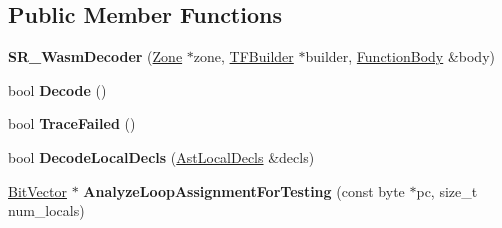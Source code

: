 \subsection*{Public Member Functions}
\begin{DoxyCompactItemize}
\item 
{\bfseries S\+R\+\_\+\+Wasm\+Decoder} (\hyperlink{classv8_1_1internal_1_1_zone}{Zone} $\ast$zone, \hyperlink{classv8_1_1internal_1_1compiler_1_1_wasm_graph_builder}{T\+F\+Builder} $\ast$builder, \hyperlink{structv8_1_1internal_1_1wasm_1_1_function_body}{Function\+Body} \&body)\hypertarget{classv8_1_1internal_1_1wasm_1_1_s_r___wasm_decoder_a44d0725a5fe471e91565af9e7aa36de5}{}\label{classv8_1_1internal_1_1wasm_1_1_s_r___wasm_decoder_a44d0725a5fe471e91565af9e7aa36de5}

\item 
bool {\bfseries Decode} ()\hypertarget{classv8_1_1internal_1_1wasm_1_1_s_r___wasm_decoder_a766eeb99e6391b6086eb6afee4bfc9d4}{}\label{classv8_1_1internal_1_1wasm_1_1_s_r___wasm_decoder_a766eeb99e6391b6086eb6afee4bfc9d4}

\item 
bool {\bfseries Trace\+Failed} ()\hypertarget{classv8_1_1internal_1_1wasm_1_1_s_r___wasm_decoder_ad526a3d0433f980d16a73b8ca4f5fc2a}{}\label{classv8_1_1internal_1_1wasm_1_1_s_r___wasm_decoder_ad526a3d0433f980d16a73b8ca4f5fc2a}

\item 
bool {\bfseries Decode\+Local\+Decls} (\hyperlink{structv8_1_1internal_1_1wasm_1_1_ast_local_decls}{Ast\+Local\+Decls} \&decls)\hypertarget{classv8_1_1internal_1_1wasm_1_1_s_r___wasm_decoder_aab7587ba2b5a821d9f4b1d0cff2a0cd6}{}\label{classv8_1_1internal_1_1wasm_1_1_s_r___wasm_decoder_aab7587ba2b5a821d9f4b1d0cff2a0cd6}

\item 
\hyperlink{classv8_1_1internal_1_1_bit_vector}{Bit\+Vector} $\ast$ {\bfseries Analyze\+Loop\+Assignment\+For\+Testing} (const byte $\ast$pc, size\+\_\+t num\+\_\+locals)\hypertarget{classv8_1_1internal_1_1wasm_1_1_s_r___wasm_decoder_a0a40abd6f274bb3813fa5646923dfdab}{}\label{classv8_1_1internal_1_1wasm_1_1_s_r___wasm_decoder_a0a40abd6f274bb3813fa5646923dfdab}

\end{DoxyCompactItemize}
